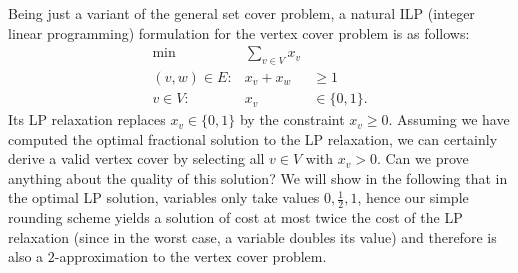 \documentclass{article}
\begin{document}
Being just a variant of the general set cover problem, a natural ILP (integer linear programming) formulation for the vertex cover problem is as follows:
\begin{eqnarray}\label{VCILP}
\mbox{min} & \displaystyle \sum_{v \in V} x_v\\
 (v,w)\in E: & x_v+x_w  & \geq 1 \nonumber\\
 v \in V: & x_v  & \in \{0,1\}. \nonumber
\end{eqnarray}
Its LP relaxation replaces $x_v \in \{0,1\}$ by the constraint $x_v\geq 0$. Assuming we have computed the optimal fractional solution to the LP relaxation, we can certainly derive a valid vertex cover by selecting all $v\in V$ with $x_v>0$. Can we prove anything about the quality of this solution? We will show in the following that in the optimal LP solution, variables only take values $0,\frac{1}{2},1$, hence our simple rounding scheme yields a solution of cost at most twice the cost of the LP relaxation (since in the worst case, a variable doubles its value) and therefore is also a $2$-approximation to the vertex cover problem.
\end{document}
